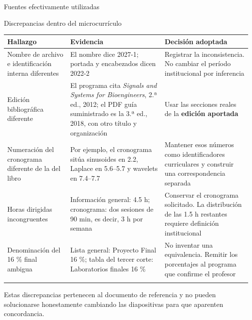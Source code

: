 \documentclass[
  10pt,
  ignorenonframetext,
  aspectratio=169,
  spanish,
]{beamer}
\begin{document}
\begin{frame}[fragile]{Fuentes efectivamente utilizadas}
\begin{block}{Discrepancias dentro del microcurrículo}
\label{discrepancias-dentro-del-microcurruxedculo}
\begin{longtable}[]{@{}
  >{\raggedright\arraybackslash}p{}
  >{\raggedright\arraybackslash}p{}
  >{\raggedright\arraybackslash}p{}@{}}
\toprule\noalign{}
\begin{minipage}[b]{\linewidth}\raggedright
Hallazgo
\end{minipage} & \begin{minipage}[b]{\linewidth}\raggedright
Evidencia
\end{minipage} & \begin{minipage}[b]{\linewidth}\raggedright
Decisión adoptada
\end{minipage} \\
\midrule\noalign{}
\endhead
Nombre de archivo e identificación interna diferentes & El nombre dice
2027-1; portada y encabezados dicen 2022-2 & Registrar la
inconsistencia. No cambiar el período institucional por inferencia \\
Edición bibliográfica diferente & El programa cita \emph{Signals and
Systems for Bioengineers}, 2.ª ed., 2012; el PDF guía suministrado es la
3.ª ed., 2018, con otro título y organización & Usar las secciones
reales de la \textbf{edición aportada} \\
Numeración del cronograma diferente de la del libro & Por ejemplo, el
cronograma sitúa sinusoides en 2.2, Laplace en 5.6--5.7 y wavelets en
7.4--7.7 & Mantener esos números como identificadores curriculares y
construir una correspondencia separada \\
Horas dirigidas incongruentes & Información general: 4.5 h; cronograma:
dos sesiones de 90 min, es decir, 3 h por semana & Conservar el
cronograma solicitado. La distribución de las 1.5 h restantes requiere
definición institucional \\
Denominación del 16 \% final ambigua & Lista general: Proyecto Final 16
\%; tabla del tercer corte: Laboratorios finales 16 \% & No inventar una
equivalencia. Remitir los porcentajes al programa que confirme el
profesor \\
\bottomrule\noalign{}
\end{longtable}

Estas discrepancias pertenecen al documento de referencia y no pueden
solucionarse honestamente cambiando las diapositivas para que aparenten
concordancia.
\end{block}
\end{frame}
\end{document}
